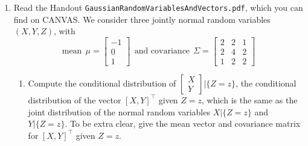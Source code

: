 \documentclass[letterpaper]{article}
\begin{document}
\begin{enumerate}
        \begin{enumerate}
\setlength{\itemsep}{.1in}
\renewcommand{\labelenumi}{(\alph{enumi})}

\item Find the Best Linear Unbiased Estimate (BLUE) for $x$, using only the first two values of $y$. Also compute the covariance of the estimate.

\item Find the Best Linear Unbiased Estimate (BLUE) for $x$, using only the first three values of $y$. Also compute the covariance of the estimate.

\item Find the Best Linear Unbiased Estimate (BLUE) for $x$, using all the values of $y$. Also compute the covariance of the estimate.

\end{enumerate}

\noindent \textbf{Note:} For (a), you use the first 2 rows of $y$ and $\mathwitch$ and the upper $2 \times 2 $ part of $Q$. For (b), you use the first 3 rows of $y$ and $C$, as well as the upper $3 \times 3 $ part of $Q$. You see the pattern, I hope. Do all the calculations in MATLAB. You do not have to turn in your code.

\item Read the Handout \texttt{GaussianRandomVariablesAndVectors.pdf}, which you can find on CANVAS. We consider three jointly normal random variables $(X,Y,Z)$, with
$$ \mbox{mean}~~\mu = \left[\begin{array}{r} -1\\  0\\  1\end{array} \right] ~~\mbox{and covariance}~~ \Sigma = \left[  \begin{array}{rrr}  2&   2&   1\\  2&   4&   2\\  1&   2&   2\end{array}
\right] $$

        \begin{enumerate}
\setlength{\itemsep}{.1in}
\renewcommand{\labelenumi}{(\alph{enumi})}

\item  Compute the conditional distribution of  $  \left[\begin{array}{r} X\\  Y\end{array} \right]  \left| {\{Z=z\} } \right.  $, the conditional distribution of the vector $[X,Y]^\top$ given $Z=z$, which is the same as the joint distribution of the normal random variables $X|\{Z=z\}$ and $Y|\{Z=z\}$. To be extra clear, give the mean vector and covariance matrix for $[X,Y]^\top$ given $Z=z$.


\end{enumerate}
\end{enumerate}
\end{document}
